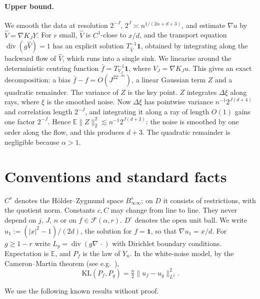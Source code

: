 \documentclass[11pt]{article}
\theoremstyle{definition}
\theoremstyle{remark}
\newcommand{\E}{\mathbb E}
\newcommand{\one}{\mathbf 1}
\newcommand{\Fc}{\mathcal F}
\newcommand{\dv}{\operatorname{div}}
\newcommand{\KL}{\mathrm{KL}}
\newcommand{\Dint}{D^{\circ}}
\begin{document}
\paragraph{Upper bound.} We smooth the data at resolution $2^{-J}$, $2^J\asymp n^{1/(2\alpha+d+3)}$, and estimate $\nabla u$ by $\hat V=\nabla K_JY$. For $r$ small, $\hat V$ is $C^1$-close to $x/d$, and the transport equation $\dv(g\hat V)=1$ has an explicit solution $T^{-1}_{\hat V}\one$, obtained by integrating along the backward flow of $\hat V$, which runs into a single sink. We linearise around the deterministic centring function $\bar f=T^{-1}_{V_J}\one$, where $V_J=\nabla K_Ju$. This gives an exact decomposition: a bias $\bar f-f=O(J^22^{-J\alpha})$, a linear Gaussian term $Z$ and a quadratic remainder. The variance of $Z$ is the key point. $Z$ integrates $\Delta\xi$ along rays, where $\xi$ is the smoothed noise. Now $\Delta\xi$ has pointwise variance $n^{-1}2^{J(d+4)}$ and correlation length $2^{-J}$, and integrating it along a ray of length $O(1)$ gains one factor $2^{-J}$. Hence $\E\|Z\|_2^2\lesssim n^{-1}2^{J(d+3)}$: the noise is smoothed by one order along the flow, and this produces $d+3$. The quadratic remainder is negligible because $\alpha>1$.

\section{Conventions and standard facts}\label{sec:facts}

$C^s$ denotes the H\"older--Zygmund space $B^s_{\infty\infty}$; on $D$ it consists of restrictions, with the quotient norm. Constants $c,C$ may change from line to line. They never depend on $j$, $J$, $n$ or on $f\in\Fc(\alpha,r)$. $\Dint$ denotes the open unit ball. We write $u_1:=(|x|^2-1)/(2d)$, the solution for $f=\one$, so that $\nabla u_1=x/d$. For $g\ge 1-r$ write $L_g=\dv(g\nabla\,\cdot)$ with Dirichlet boundary conditions. Expectation is $\E$, and $P_f$ is the law of $Y_n$. In the white-noise model, by the Cameron--Martin theorem (see e.g.\ \cite{GN16}),
\[
\KL(P_f,P_g)=\tfrac n2\|u_f-u_g\|_{L^2}^2 .
\]


We use the following known results without proof.
\end{document}
